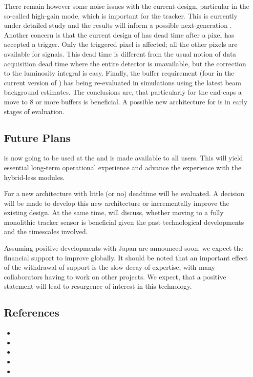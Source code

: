 There remain however some noise issues with the current \KPIX design, particular in the so-called high-gain mode, 
which is important for the tracker. This is currently under detailed study and the results will inform a possible 
next-generation \KPIX. Another concern is that the current design of \KPIX has dead time after a pixel 
has accepted a trigger. Only the triggered pixel is affected; all the other 
pixels are available for signals. This dead time is different from the usual 
notion of data acquisition dead time where the entire detector is unavailable, 
but the correction to the luminosity integral is easy. Finally, the buffer 
requirement (four in the current version of \KPIX) has being re-evaluated in \SID  
simulations using the latest beam background estimates. The conclusions are, that particularly for 
the end-caps a move to 8 or more buffers is beneficial. A possible new architecture for \KPIX is in early stages of  evaluation.


\subsection{Future Plans}
\LYCORIS is now going to be used at the \DIITBF and is made available to all users. This will yield essential long-term operational experience and 
advance the experience with the hybrid-less modules.  

For \KPIX a new architecture with little (or no) deadtime will be evaluated. A decision will be made to develop this new architecture or incrementally 
improve the existing design. At the same time, \SID will discuss, whether moving to a fully monolithic tracker sensor is beneficial given the past technological 
developments and the timescales involved.
	
Assuming positive developments with Japan are announced soon, we expect the financial support to improve globally. It should be noted that
an important effect of the withdrawal of support is the slow decay of expertise, with many collaborators having to work on other projects. We expect, that 
a positive statement will lead to resurgence of interest in this technology.

	
\subsection{References}

\begin{itemize}
\item {}
\item {}
\item {}
\item {}
\item {}
\end{itemize}
